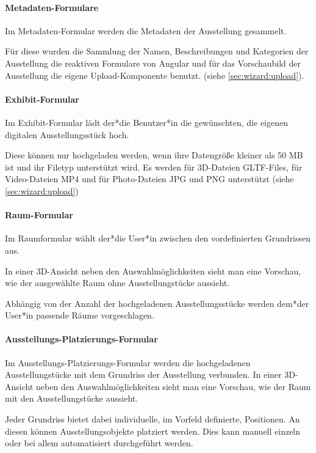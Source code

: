 \paragraph{Metadaten-Formulare}
Im Metadaten-Formular werden die Metadaten der Ausstellung gesammelt.


Für diese wurden die Sammlung der Namen, Beschreibungen und Kategorien der Ausstellung die reaktiven Formulare von Angular und für das Vorschaubild der Ausstellung die eigene Upload-Komponente benutzt. (siehe \ref{sec:wizard:upload}).


\paragraph{Exhibit-Formular}
Im Exhibit-Formular lädt der*die Benutzer*in die gewünschten, die eigenen digitalen Ausstellungsstück hoch.

Diese können nur hochgeladen werden, wenn ihre Datengröße kleiner als 50 MB ist und ihr Filetyp unterstützt wird. Es werden für 3D-Dateien GLTF-Files, für Video-Dateien MP4 und für Photo-Dateien JPG und PNG unterstützt (siehe \ref{sec:wizard:upload})

\paragraph{Raum-Formular}
Im Raumformular wählt der*die User*in zwischen den vordefinierten Grundrissen aus.

In einer 3D-Ansicht neben den Auswahlmöglichkeiten sieht man eine Vorschau, wie der ausgewählte Raum ohne Ausstellungstücke aussieht. 

Abhängig von der Anzahl der hochgeladenen Ausstellungsstücke werden dem*der User*in passende Räume vorgeschlagen.

\paragraph{Ausstellungs-Platzierungs-Formular}
Im Ausstellungs-Platzierungs-Formular werden die hochgeladenen Ausstellungstücke mit dem Grundriss der Ausstellung verbunden.  In einer 3D-Ansicht neben den Auswahlmöglichkeiten sieht man eine Vorschau, wie der Raum mit den Ausstellungstücke aussieht. 

Jeder Grundriss bietet dabei individuelle, im Vorfeld definierte, Positionen. An diesen können Ausstellungsobjekte
platziert werden. Dies kann manuell einzeln oder bei allem automatisiert durchgeführt werden.

